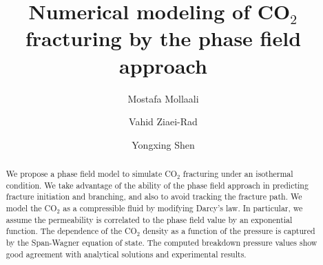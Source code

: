 \documentclass{elsarticle}
\begin{document}
\begin{frontmatter}

\title{Numerical modeling of CO$_2$ fracturing by the phase field approach}


\author[mymainaddress]{Mostafa Mollaali}

\author[mysecondaryaddress]{Vahid Ziaei-Rad}

\author[mymainaddress]{Yongxing Shen}

\address[mymainaddress]{University of Michigan -- Shanghai Jiao Tong University Joint Institute, Shanghai Jiao Tong University,	Shanghai, 200240, China}
\address[mysecondaryaddress]{Department of Civil Engineering, Isfahan University of Technology, Isfahan 84156-83111, Iran}

\begin{abstract}

We propose a phase field model to simulate CO$_2$ fracturing under an isothermal condition. We take advantage of the ability of the phase field approach in predicting fracture initiation and branching, and also to avoid tracking the fracture path. We model the CO$_2$ as a compressible fluid by modifying Darcy's law. In particular, we assume the permeability is correlated to the phase field value by an exponential function. The dependence of the CO$_2$ density as a function of the pressure is captured by the Span-Wagner equation of state. The computed breakdown pressure values show good agreement with analytical solutions and experimental results.
\end{abstract}


\end{frontmatter}
\end{document}
